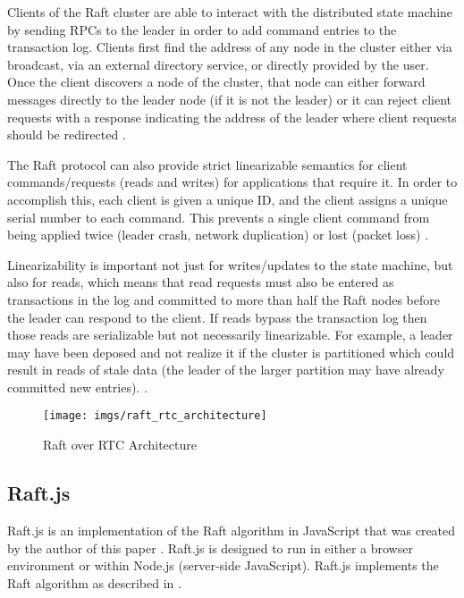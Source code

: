 \documentclass[conference,compsoc]{./IEEEtran/IEEEtran}
\begin{document}
Clients of the Raft cluster are able to interact with the distributed
state machine by sending RPCs to the leader in order to add command
entries to the transaction log. Clients first find the address of any
node in the cluster either via broadcast, via an external directory
service, or directly provided by the user. Once the client discovers
a node of the cluster, that node can either forward messages directly
to the leader node (if it is not the leader) or it can reject client
requests with a response indicating the address of the leader where
client requests should be redirected
\cite[Section~6.2]{raft_thesis:ongaro14}.

The Raft protocol can also provide strict linearizable semantics for
client commands/requests (reads and writes) for applications that
require it. In order to accomplish this, each client is given a unique
ID, and the client assigns a unique serial number to each command.
This prevents a single client command from being applied twice (leader
crash, network duplication) or lost (packet loss)
\cite[Section~6.3]{raft_thesis:ongaro14}.

Linearizability is important not just for writes/updates to the state
machine, but also for reads, which means that read requests must also
be entered as transactions in the log and committed to more than half
the Raft nodes before the leader can respond to the client. If reads
bypass the transaction log then those reads are serializable but not
necessarily linearizable. For example, a leader may have been deposed
and not realize it if the cluster is partitioned which could result in
reads of stale data (the leader of the larger partition may have
already committed new entries).
\cite[Section~6.4]{raft_thesis:ongaro14}.

\begin{figure*}[!t]
\centerline{\texttt{[image: imgs/raft\_rtc\_architecture]}}
\caption{Raft over RTC Architecture}
  \label{fig:raft_rtc_architecture}
\end{figure*}

\subsection{Raft.js}

Raft.js is an implementation of the Raft algorithm in JavaScript that
was created by the author of this paper \cite{raft.js}.  Raft.js is
designed to run in either a browser environment or within Node.js
(server-side JavaScript). Raft.js implements the Raft algorithm as
described in \cite[Consensus:~Diego]{raft_thesis:ongaro14}.
\end{document}
